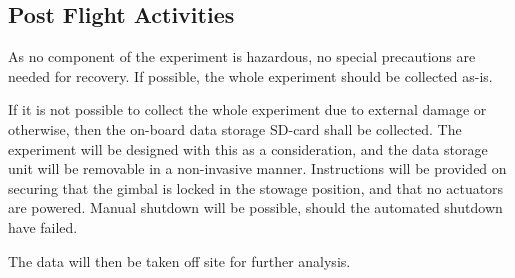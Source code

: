 \subsection{Post Flight Activities}
As no component of the experiment is hazardous, no special precautions are needed for recovery. If possible, the whole experiment should be collected as-is.

If it is not possible to collect the whole experiment due to external damage or otherwise, then the on-board data storage SD-card shall be collected. The experiment will be designed with this as a consideration, and the data storage unit will be removable in a non-invasive manner. Instructions will be provided on securing that the gimbal is locked in the stowage position, and that no actuators are powered. Manual shutdown will be possible, should the automated shutdown have failed.

The data will then be taken off site for further analysis.


